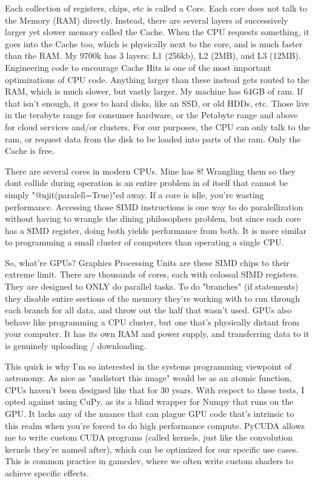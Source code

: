 \documentclass[%
 reprint,
 amsmath,amssymb,
 aps,
showkeys,
]{revtex4-2}
\begin{document}
Each collection of registers, chips, etc is called a Core. Each core does not talk to the Memory (RAM) directly. Instead, there are several layers of successively larger yet slower memory called the Cache. When the CPU requests something, it goes into the Cache too, which is physically next to the core, and is much faster than the RAM. My 9700k has 3 layers: L1 (256kb), L2 (2MB), and L3 (12MB). Engineering code to encourage Cache Hits is one of the most important optimizations of CPU code. Anything larger than these instead gets routed to the RAM, which is much slower, but vastly larger. My machine has 64GB of ram. If that isn't enough, it goes to hard disks, like an SSD, or old HDDs, etc. Those live in the terabyte range for consumer hardware, or the Petabyte range and above for cloud services and/or clusters. For our purposes, the CPU can only talk to the ram, or request data from the disk to be loaded into parts of the ram. Only the Cache is free.

There are several cores in modern CPUs. Mine has 8! Wrangling them so they dont collide during operation is an entire problem in of itself that cannot be simply "@njit(paralell=True)"ed away. If a core is idle, you're wasting performance. Accessing those SIMD instructions is one way to do paralellization without having to wrangle the dining philosophers problem, but since each core has a SIMD register, doing both yields performance from both. It is more similar to programming a small cluster of computers than operating a single CPU.

So, what're GPUs? Graphics Processing Units are these SIMD chips to their extreme limit. There are thousands of cores, each with colossal SIMD registers. They are designed to ONLY do parallel tasks. To do "branches" (if statements) they disable entire sections of the memory they're working with to run through each branch for all data, and throw out the half that wasn't used. GPUs also behave like programming a CPU cluster, but one that's physically distant from your computer. It has its own RAM and power supply, and transferring data to it is genuinely uploading / downloading. 

This quirk is why I'm so interested in the systems programming viewpoint of astronomy. As nice as "undistort this image" would be as an atomic function, CPUs haven't been designed like that for 30 years. With respect to these tests, I opted against using CuPy, as its a blind wrapper for Numpy that runs on the GPU. It lacks any of the nuance that can plague GPU code that's intrinsic to this realm when you're forced to do high performance compute.  PyCUDA allows me to write custom CUDA programs (called kernels, just like the convolution kernels they're named after), which can be optimized for our specific use cases. This is common practice in gamedev, where we often write custom shaders to achieve specific effects. 
\end{document}
